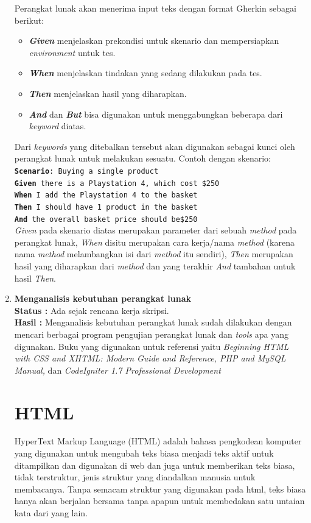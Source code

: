 \documentclass[a4paper,twoside]{article}
\begin{document}
\begin{enumerate}
Perangkat lunak akan menerima input teks dengan format Gherkin sebagai berikut:
\begin{itemize}
 \item \textit{\textbf{Given}} menjelaskan prekondisi untuk skenario dan mempersiapkan \textit{environment} untuk tes.
 \item \textit{\textbf{When}} menjelaskan tindakan yang sedang dilakukan pada tes.
 \item \textit{\textbf{Then}} menjelaskan hasil yang diharapkan.
 \item \textit{\textbf{And}} dan \textit{\textbf{But}} bisa digunakan untuk menggabungkan beberapa dari \textit{keyword} diatas.
\end{itemize}
Dari \textit{keywords} yang ditebalkan tersebut akan digunakan sebagai kunci oleh perangkat lunak untuk melakukan sesuatu. Contoh dengan skenario:\\
\texttt{\textbf{Scenario}: Buying a single product\\
\textbf{Given} there is a Playstation 4, which cost \$250\\
\textbf{When} I add the Playstation 4 to the basket\\
\textbf{Then} I should have 1 product in the basket\\
\textbf{And} the overall basket price should be\$250\\}
\textit{Given} pada skenario diatas merupakan parameter dari sebuah \textit{method} pada perangkat lunak, \textit{When} disitu merupakan cara kerja/nama \textit{method} (karena nama \textit{method} melambangkan isi dari \textit{method} itu sendiri),  \textit{Then} merupakan hasil yang diharapkan dari \textit{method} dan yang terakhir \textit{And} tambahan untuk hasil \textit{Then}. 
		\item \textbf{Menganalisis kebutuhan perangkat lunak}\\
		{\bf Status :} Ada sejak rencana kerja skripsi.\\
		{\bf Hasil :} Menganalisis kebutuhan perangkat lunak sudah dilakukan dengan mencari berbagai program pengujian perangkat lunak dan \textit{tools} apa yang digunakan. Buku yang digunakan untuk referensi yaitu \textit{Beginning HTML with CSS and XHTML: Modern Guide and Reference, PHP and MySQL Manual,} dan \textit{CodeIgniter 1.7 Professional 
Development}

\section*{HTML}
HyperText Markup Language (HTML) adalah bahasa pengkodean komputer yang digunakan untuk mengubah teks biasa menjadi teks aktif untuk ditampilkan dan digunakan di web dan juga untuk memberikan teks biasa, tidak terstruktur, jenis struktur yang diandalkan manusia untuk membacanya. Tanpa semacam struktur yang digunakan pada html, teks biasa hanya akan berjalan bersama tanpa apapun untuk membedakan satu untaian kata dari yang lain.


\end{enumerate}
\end{document}
